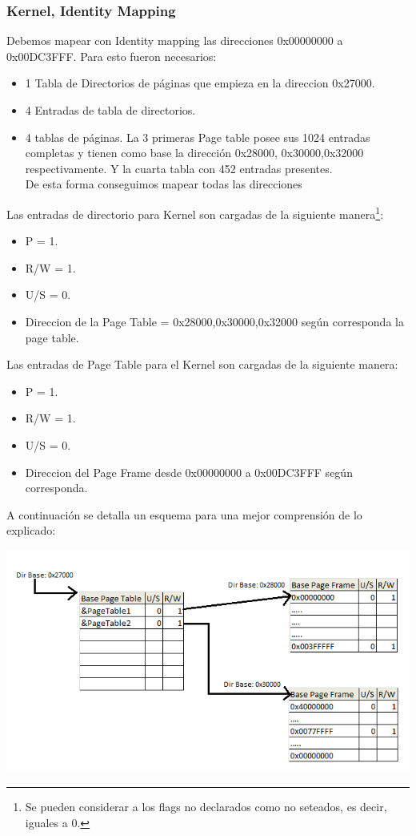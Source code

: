 \subsubsection{Kernel, Identity Mapping}
Debemos mapear con Identity mapping las direcciones 0x00000000 a 0x00DC3FFF. Para esto fueron necesarios:
\begin{itemize}
 \item 1 Tabla de Directorios de p\'aginas que empieza en la direccion 0x27000.
 \item 4 Entradas de tabla de directorios. 
 \item 4 tablas de p\'aginas. La 3 primeras Page table posee sus 1024 entradas completas  
y tienen como base la direcci\'on 0x28000, 0x30000,0x32000 respectivamente. Y la cuarta tabla con 452 entradas presentes. \\
De esta forma conseguimos mapear todas las direcciones
\end{itemize}

Las entradas de directorio para Kernel son cargadas de la siguiente manera\footnote{Se pueden considerar a los flags no declarados como
no seteados, es decir, iguales a 0.}:
\begin{itemize}
 \item P = 1.
 \item R/W = 1.
 \item U/S = 0.
 \item Direccion de la Page Table = 0x28000,0x30000,0x32000 seg\'un corresponda la  page table.
\end{itemize}

Las entradas de Page Table para el Kernel son cargadas de la siguiente manera\footnotemark[3]:
\begin{itemize}
 \item P = 1.
 \item R/W = 1.
 \item U/S = 0.
 \item Direccion del Page Frame desde 0x00000000 a 0x00DC3FFF seg\'un corresponda.
\end{itemize}

A continuaci\'on se detalla un esquema para una mejor comprensi\'on de lo explicado:

\includegraphics[scale=0.6]{imagenes/tablasDePaginasEj3.png}


